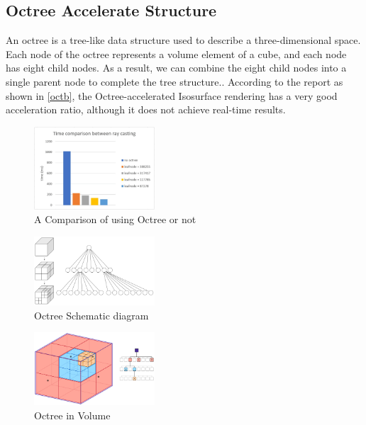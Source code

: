\documentclass[sigconf]{acmart}
\begin{document}
\subsection{Octree Accelerate Structure}
An octree is a tree-like data structure used to describe a three-dimensional space. Each node of the octree represents a volume element of a cube, and each node has eight child nodes. As a result, we can combine the eight child nodes into a single parent node to complete the tree structure.\cite{Knoll2006InteractiveIR}.
According to the report\cite{SHTUCS1728:online} as shown in \ref{octb}, the Octree-accelerated Isosurface rendering has a very good acceleration ratio, although it does not achieve real-time results.
\begin{figure}
    \centering
    \includegraphics[width=0.4\textwidth]{imgs/octb.png}
    \caption{A Comparison of using Octree or not\cite{SHTUCS1728:online}}
    \label{fig:octb}
\end{figure}
\begin{figure}
    \centering
    \includegraphics[width=0.4\textwidth]{../imgs/octree.png}
    \caption{Octree Schematic diagram}
    \label{fig:oct1}
\end{figure}

\begin{figure}
    \centering
    \includegraphics[width=0.4\textwidth]{../imgs/octree2.png}
    \caption{Octree in Volume}
    \label{fig:octreevol}
\end{figure}
\end{document}
